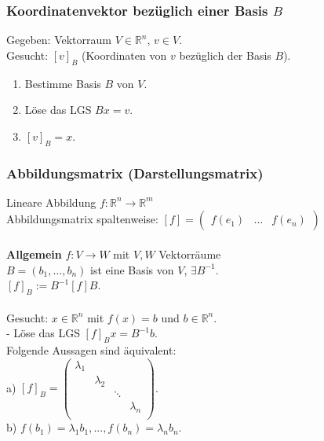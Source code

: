 \documentclass[6pt,a4paper]{scrartcl}
\begin{document}
\begin{multicols*}{4}
\subsubsection{Koordinatenvektor bezüglich einer Basis $B$}
Gegeben: Vektorraum $V \in\mathbb{R}^n$, $v \in V$.\\
Gesucht: $[v]_B$ (Koordinaten von $v$ bezüglich der Basis $B$).
\begin{enumerate}
	\item Bestimme Basis $B$ von $V$.
	\item Löse das LGS $Bx = v$.
	\item $[v]_B = x$.
\end{enumerate}
\subsubsection{Abbildungsmatrix (Darstellungsmatrix)}
Lineare Abbildung $f:\mathbb{R}^n \rightarrow \mathbb{R}^m$ \\
Abbildungsmatrix spaltenweise:
$[f] = \begin{pmatrix}f(e_1) & \dots & f(e_n)
\end{pmatrix} $ \\ \\
\textbf{Allgemein} $f:V\rightarrow W$ mit $V, W$ Vektorräume \\
$B=(b_1,\dots,b_n)$ ist eine Basis von $V$, $\exists B^{-1}$. \\
$[f]_B := B^{-1}[f]B$.\\ \\
Gesucht: $x \in\mathbb{R}^n$ mit $f(x) = b$ und $b\in\mathbb{R}^n$.\\
- Löse das LGS $[f]_Bx = B^{-1}b$.\\
Folgende Aussagen sind äquivalent:\\
a) $[f]_B = \begin{pmatrix}
\lambda_1 & & & \\
& \lambda_2 & & \\
& & \ddots & \\
& & & \lambda_n \\ 
\end{pmatrix}$.\\
b) $f(b_1) = \lambda_1b_1, ..., f(b_n) = \lambda_nb_n$.\\ \\


\end{multicols*}
\end{document}
